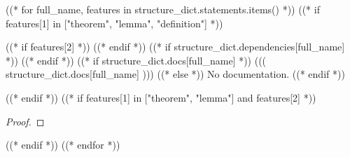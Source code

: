
((* for full_name, features in structure_dict.statements.items() *))
((* if features[1] in ["theorem", "lemma", "definition"] *))
\begin{((( features[1] )))}\label{((( full_name )))}
    ((* if features[2] *))
    \leanok
    ((* endif *))
    ((* if structure_dict.dependencies[full_name] *))
    ((* endif *))
    ((* if structure_dict.docs[full_name] *))
        ((( structure_dict.docs[full_name] )))
    ((* else *))
        No documentation.
    ((* endif *))
\end{((( features[1] )))}

((* endif *))
((* if features[1] in ["theorem", "lemma"] and features[2] *))
\begin{proof}
    \leanok
\end{proof}

((* endif *))
((* endfor *))